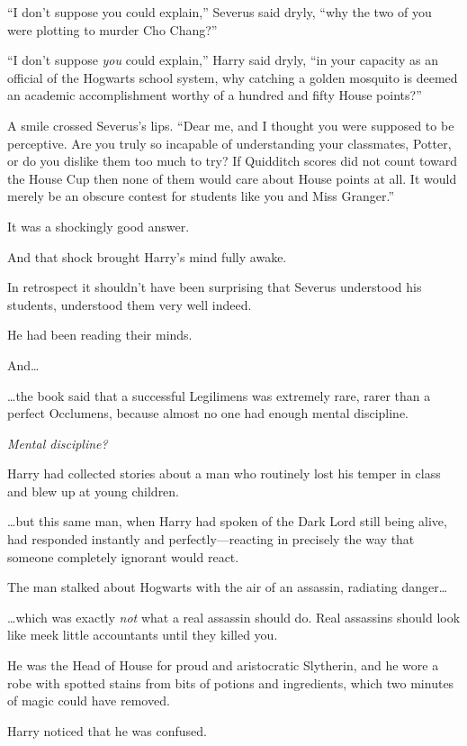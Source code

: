 ``I don't suppose you could explain,'' Severus said dryly, ``why the two
of you were plotting to murder Cho Chang?''

``I don't suppose \emph{you} could explain,'' Harry said dryly, ``in
your capacity as an official of the Hogwarts school system, why catching
a golden mosquito is deemed an academic accomplishment worthy of a
hundred and fifty House points?''

A smile crossed Severus's lips. ``Dear me, and I thought you were
supposed to be perceptive. Are you truly so incapable of understanding
your classmates, Potter, or do you dislike them too much to try? If
Quidditch scores did not count toward the House Cup then none of them
would care about House points at all. It would merely be an obscure
contest for students like you and Miss Granger.''

It was a shockingly good answer.

And that shock brought Harry's mind fully awake.

In retrospect it shouldn't have been surprising that Severus understood
his students, understood them very well indeed.

He had been reading their minds.

And\ldots{}

\ldots{}the book said that a successful Legilimens was extremely rare,
rarer than a perfect Occlumens, because almost no one had enough mental
discipline.

\emph{Mental discipline?}

Harry had collected stories about a man who routinely lost his temper in
class and blew up at young children.

\ldots{}but this same man, when Harry had spoken of the Dark Lord still
being alive, had responded instantly and perfectly---reacting in
precisely the way that someone completely ignorant would react.

The man stalked about Hogwarts with the air of an assassin, radiating
danger\ldots{}

\ldots{}which was exactly \emph{not} what a real assassin should do.
Real assassins should look like meek little accountants until they
killed you.

He was the Head of House for proud and aristocratic Slytherin, and he
wore a robe with spotted stains from bits of potions and ingredients,
which two minutes of magic could have removed.

Harry noticed that he was confused.

